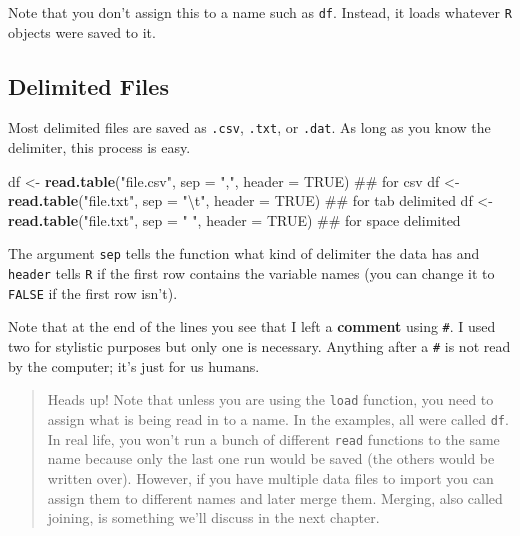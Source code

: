 \documentclass[]{tufte-book}
\newenvironment{Shaded}{}{}
\newcommand{\KeywordTok}[1]{\textcolor[rgb]{0.00,0.44,0.13}{\textbf{#1}}}
\newcommand{\DataTypeTok}[1]{\textcolor[rgb]{0.56,0.13,0.00}{#1}}
\newcommand{\CharTok}[1]{\textcolor[rgb]{0.25,0.44,0.63}{#1}}
\newcommand{\StringTok}[1]{\textcolor[rgb]{0.25,0.44,0.63}{#1}}
\newcommand{\OtherTok}[1]{\textcolor[rgb]{0.00,0.44,0.13}{#1}}
\newcommand{\NormalTok}[1]{#1}
\theoremstyle{definition}
\theoremstyle{definition}
\theoremstyle{remark}
\begin{document}
Note that you don't assign this to a name such as \texttt{df}. Instead,
it loads whatever \texttt{R} objects were saved to it.

\subsection*{Delimited Files}\label{delimited-files}

Most delimited files are saved as \texttt{.csv}, \texttt{.txt}, or
\texttt{.dat}. As long as you know the delimiter, this process is easy.

\begin{Shaded}
\begin{Highlighting}[]
\NormalTok{df <-}\StringTok{ }\KeywordTok{read.table}\NormalTok{(}\StringTok{"file.csv"}\NormalTok{, }\DataTypeTok{sep =} \StringTok{","}\NormalTok{, }\DataTypeTok{header =} \OtherTok{TRUE}\NormalTok{)  ## for csv}
\NormalTok{df <-}\StringTok{ }\KeywordTok{read.table}\NormalTok{(}\StringTok{"file.txt"}\NormalTok{, }\DataTypeTok{sep =} \StringTok{"}\CharTok{\textbackslash{}t}\StringTok{"}\NormalTok{, }\DataTypeTok{header =} \OtherTok{TRUE}\NormalTok{)  ## for tab delimited}
\NormalTok{df <-}\StringTok{ }\KeywordTok{read.table}\NormalTok{(}\StringTok{"file.txt"}\NormalTok{, }\DataTypeTok{sep =} \StringTok{" "}\NormalTok{, }\DataTypeTok{header =} \OtherTok{TRUE}\NormalTok{)  ## for space delimited}
\end{Highlighting}
\end{Shaded}

The argument \texttt{sep} tells the function what kind of delimiter the
data has and \texttt{header} tells \texttt{R} if the first row contains
the variable names (you can change it to \texttt{FALSE} if the first row
isn't).

Note that at the end of the lines you see that I left a \textbf{comment}
using \texttt{\#}. I used two for stylistic purposes but only one is
necessary. Anything after a \texttt{\#} is not read by the computer;
it's just for us humans.

\begin{quote}
Heads up! Note that unless you are using the \texttt{load} function, you
need to assign what is being read in to a name. In the examples, all
were called \texttt{df}. In real life, you won't run a bunch of
different \texttt{read} functions to the same name because only the last
one run would be saved (the others would be written over). However, if
you have multiple data files to import you can assign them to different
names and later merge them. Merging, also called joining, is something
we'll discuss in the next chapter.
\end{quote}
\end{document}
